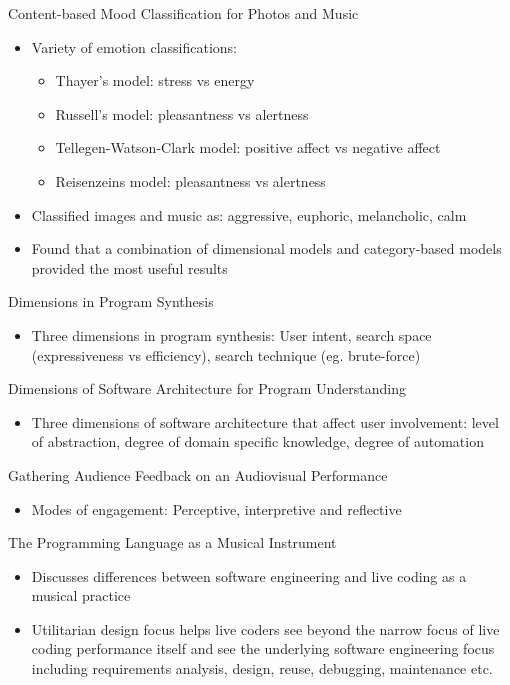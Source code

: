 Content-based Mood Classification for Photos and Music
\begin{itemize}
\item Variety of emotion classifications:
\begin{itemize}
	\item Thayer’s model: stress vs energy
	\item Russell’s model: pleasantness vs alertness
	\item Tellegen-Watson-Clark model: positive affect vs negative affect
	\item Reisenzeins model: pleasantness vs alertness
	\end{itemize}
\item Classified images and music as: aggressive, euphoric, melancholic, calm
\item Found that a combination of dimensional models and category-based models provided the most useful results
\end{itemize}

Dimensions in Program Synthesis
\begin{itemize}
\item Three dimensions in program synthesis: User intent, search space (expressiveness vs efficiency), search technique (eg. brute-force)
\end{itemize}

Dimensions of Software Architecture for Program Understanding
\begin{itemize}
\item Three dimensions of software architecture that affect user involvement: level of abstraction, degree of domain specific knowledge, degree of automation
\end{itemize}

Gathering Audience Feedback on an Audiovisual Performance
\begin{itemize}
\item Modes of engagement: Perceptive, interpretive and reflective
\end{itemize}

The Programming Language as a Musical Instrument
\begin{itemize}
\item Discusses differences between software engineering and live coding as a musical practice
\item Utilitarian design focus helps live coders see beyond the narrow focus of live coding performance itself and see the underlying software engineering focus including requirements analysis, design, reuse, debugging, maintenance etc.
\end{itemize}

